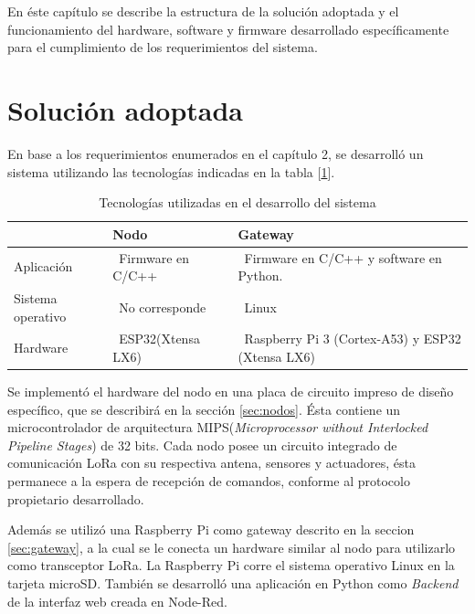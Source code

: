 En éste capítulo se describe la estructura de la solución adoptada y el funcionamiento del hardware, software y firmware desarrollado específicamente para el cumplimiento de los requerimientos del sistema.

\section{Solución adoptada}

En base a los requerimientos enumerados en el capítulo 2, se desarrolló un sistema utilizando las tecnologías indicadas en la tabla [\ref{tab:solucionadoptada}].

\begin{table}[h]
	\centering
	\caption[Solución adoptada]{Tecnologías utilizadas en el desarrollo del sistema}
	\begin{tabular}{l m{4.5cm} m{4.5cm}}    
		\toprule
		\textbf{}  					& \textbf{Nodo}     				& \textbf{Gateway}	\\
		\midrule
		Aplicación 					& \ Firmware en C/C++				& \ Firmware en C/C++ y software en Python. \\
		Sistema operativo	 		& \ No corresponde 					& \ Linux\\
		Hardware		 			& \ ESP32(Xtensa LX6) 				& \ Raspberry Pi 3 (Cortex-A53) y ESP32 (Xtensa LX6)\\
		\bottomrule
		\hline
	\end{tabular}
	\label{tab:solucionadoptada}
\end{table}

Se implementó el hardware del nodo en una placa de circuito impreso de diseño específico, que se describirá en la sección \ref{sec:nodos}. Ésta contiene un microcontrolador de arquitectura MIPS({\textit{Microprocessor without Interlocked Pipeline Stages}}) de 32 bits. Cada nodo posee un circuito integrado de comunicación LoRa con su respectiva antena, sensores y actuadores, ésta permanece a la espera de recepción de comandos, conforme al protocolo propietario desarrollado.

Además se utilizó una Raspberry Pi como gateway descrito en la seccion \ref{sec:gateway}, a la cual se le conecta un hardware similar al nodo para utilizarlo como transceptor LoRa. La Raspberry Pi corre el sistema operativo Linux en la tarjeta microSD. También se desarrolló una aplicación en Python como {\textit{Backend}} de la interfaz web creada en Node-Red.


